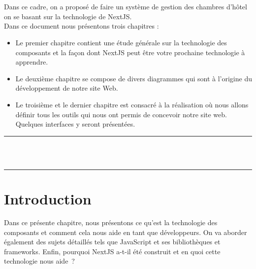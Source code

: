 \documentclass[12pt]{report}
\begin{document}
\\\\
\hspace*{0.16in}
Dans ce cadre, on a proposé de faire un système de gestion des chambres d’hôtel on se basant sur la technologie de NextJS.
\\
Dans ce document nous présentons trois chapitres :

\begin{itemize}
    \item Le premier chapitre contient une étude générale sur la technologie des composants et la façon dont NextJS peut être votre prochaine technologie à apprendre.
    \item Le deuxième chapitre se compose de divers diagrammes qui sont à l’origine du développement de notre site Web.
    \item Le troisième et le dernier chapitre est consacré à la réalisation où nous allons définir tous les outils qui nous ont permis de concevoir notre site web. Quelques interfaces y seront présentées.
\end{itemize}

\newpage

\vspace*{\fill}
\begin{center}
    {\color{Blue} \rule{\linewidth}{1.2mm} }\\
\vspace{0.25in}
 {\centering{}}
\vspace{0.35in}\\
    {\color{Blue} \rule{\linewidth}{1.2mm} }
\end{center}
\vspace*{\fill}
\setcounter{section}{0}

\newpage

\section{Introduction}
\vspace{0.2in}
\hspace*{0.16in}
Dans ce présente chapitre, nous présentons ce qu’est la technologie des composants et comment cela nous aide en tant que développeurs. On va aborder également des sujets détaillés tels que JavaScript et ses bibliothèques et frameworks. Enfin, pourquoi NextJS a-t-il été construit et en quoi cette technologie nous aide ?
\end{document}
